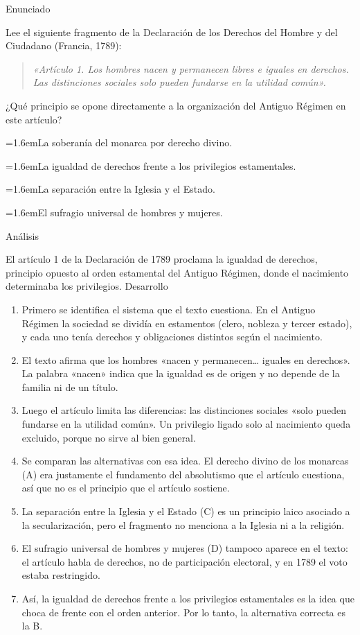 \documentclass[10pt,a4paper,twocolumn]{article}
\newcommand{\alternativa}[2]{\par\noindent\hangindent=1.6em\hangafter=1\makebox[1.6em][l]{\tecla{#1}}#2\par}
\newcommand{\clave}[1]{\par\smallskip{\sffamily\footnotesize\color{esmeralda} Clave \teclaok{#1}}\par}
\begin{document}
\begin{ejemplo}
{\sffamily\footnotesize\color{zinc500} Enunciado}\par
Lee el siguiente fragmento de la Declaración de los Derechos del Hombre y del Ciudadano (Francia, 1789):

\begin{quote}\itshape «Artículo 1. Los hombres nacen y permanecen libres e iguales en derechos. Las distinciones sociales solo pueden fundarse en la utilidad común».\end{quote}

¿Qué principio se opone directamente a la organización del Antiguo Régimen en este artículo?
\alternativa{A}{La soberanía del monarca por derecho divino.}
\alternativa{B}{La igualdad de derechos frente a los privilegios estamentales.}
\alternativa{C}{La separación entre la Iglesia y el Estado.}
\alternativa{D}{El sufragio universal de hombres y mujeres.}
\clave{B}
{\sffamily\footnotesize\color{zinc500} Análisis}\par El artículo 1 de la Declaración de 1789 proclama la igualdad de derechos, principio opuesto al orden estamental del Antiguo Régimen, donde el nacimiento determinaba los privilegios.
{\sffamily\footnotesize\color{zinc500} Desarrollo}
\begin{enumerate}
  \item Primero se identifica el sistema que el texto cuestiona. En el Antiguo Régimen la sociedad se dividía en estamentos (clero, nobleza y tercer estado), y cada uno tenía derechos y obligaciones distintos según el nacimiento.
  \item El texto afirma que los hombres «nacen y permanecen\ldots{} iguales en derechos». La palabra «nacen» indica que la igualdad es de origen y no depende de la familia ni de un título.
  \item Luego el artículo limita las diferencias: las distinciones sociales «solo pueden fundarse en la utilidad común». Un privilegio ligado solo al nacimiento queda excluido, porque no sirve al bien general.
  \item Se comparan las alternativas con esa idea. El derecho divino de los monarcas (A) era justamente el fundamento del absolutismo que el artículo cuestiona, así que no es el principio que el artículo sostiene.
  \item La separación entre la Iglesia y el Estado (C) es un principio laico asociado a la secularización, pero el fragmento no menciona a la Iglesia ni a la religión.
  \item El sufragio universal de hombres y mujeres (D) tampoco aparece en el texto: el artículo habla de derechos, no de participación electoral, y en 1789 el voto estaba restringido.
  \item Así, la igualdad de derechos frente a los privilegios estamentales es la idea que choca de frente con el orden anterior. Por lo tanto, la alternativa correcta es la B.
\end{enumerate}
\end{ejemplo}
\end{document}
